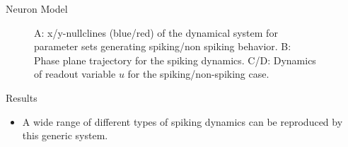 \documentclass{beamer}
\begin{document}
\begin{frame}[t]
\begin{columns}
\begin{column}{.45\textwidth}
\begin{block}{Neuron Model}
\begin{figure}
\label{fig:dynamics_illustr}
\caption{A: x/y-nullclines (blue/red) of the dynamical system for parameter sets generating spiking/non spiking behavior. B: Phase plane trajectory for the spiking dynamics. C/D: Dynamics of readout variable $u$ for the spiking/non-spiking case.}
\end{figure}
\end{block}
\begin{block}{Results}
\begin{itemize}
\item A wide range of different types of spiking dynamics can be reproduced by this generic system.
\end{itemize}
\end{block}
\end{column}
\begin{column}{.45\textwidth}

\end{column}
\end{columns}
\end{frame}
\end{document}
